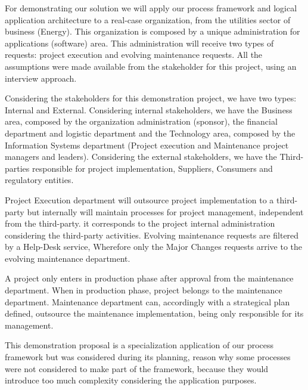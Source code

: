 For demonstrating our solution we will apply our process framework and logical application architecture to a real-case organization, from the utilities sector of business (Energy). This organization is composed by a unique administration for applications (software) area. This administration will receive two types of requests: project execution and evolving maintenance requests. All the assumptions were made available from the stakeholder for this project, using an interview approach.\par
Considering the stakeholders for this demonstration project, we have two types: Internal and External. Considering internal stakeholders, we have the Business area, composed by the organization administration (sponsor), the financial department and logistic department and the Technology area, composed by the Information Systems department (Project execution and Maintenance project managers and leaders). Considering the external stakeholders, we have the Third-parties responsible for project implementation, Suppliers, Consumers and regulatory entities.\par
Project Execution department will outsource project implementation to a third-party but internally will maintain processes for project management, independent from the third-party. it corresponds to the project internal administration considering the third-party activities. Evolving maintenance requests are filtered by a Help-Desk service, Wherefore only the Major Changes requests arrive to the evolving maintenance department.\par
A project only enters in production phase after approval from the maintenance department. When in production phase, project belongs to the maintenance department. Maintenance department can, accordingly with a strategical plan defined, outsource the maintenance implementation, being only responsible for its management.\par
This demonstration proposal is a specialization application of our process framework but was considered during its planning, reason why some processes were not considered to make part of the framework, because they would introduce too much complexity considering the application purposes.\par




